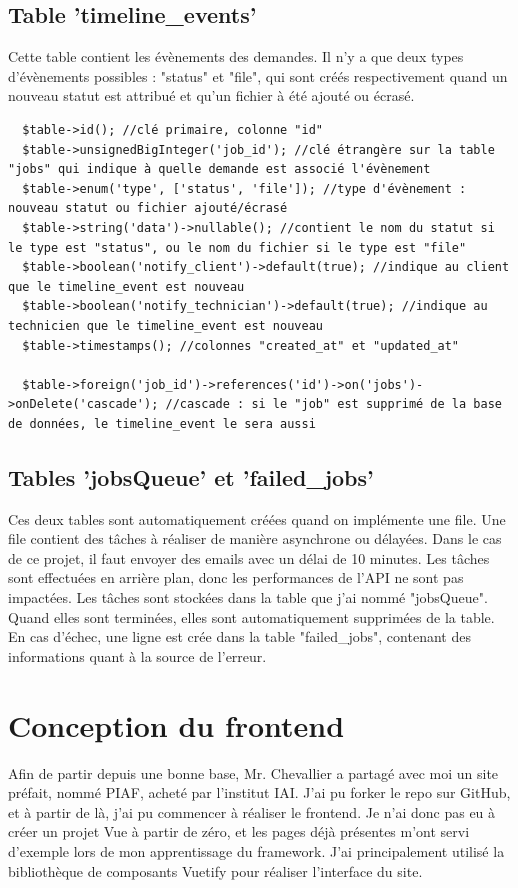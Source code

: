 \documentclass[
    iai, %
    eai, %
]{heig-tb}
\begin{document}
\section{Table 'timeline\_events'}
Cette table contient les évènements des demandes. Il n'y a que deux types d'évènements possibles : "status" et "file", qui sont créés respectivement quand un nouveau statut est attribué et qu'un fichier à été ajouté ou écrasé.

\begin{verbatim}
  $table->id(); //clé primaire, colonne "id"
  $table->unsignedBigInteger('job_id'); //clé étrangère sur la table "jobs" qui indique à quelle demande est associé l'évènement
  $table->enum('type', ['status', 'file']); //type d'évènement : nouveau statut ou fichier ajouté/écrasé
  $table->string('data')->nullable(); //contient le nom du statut si le type est "status", ou le nom du fichier si le type est "file"
  $table->boolean('notify_client')->default(true); //indique au client que le timeline_event est nouveau
  $table->boolean('notify_technician')->default(true); //indique au technicien que le timeline_event est nouveau
  $table->timestamps(); //colonnes "created_at" et "updated_at"

  $table->foreign('job_id')->references('id')->on('jobs')->onDelete('cascade'); //cascade : si le "job" est supprimé de la base de données, le timeline_event le sera aussi
\end{verbatim}

\section{Tables 'jobsQueue' et 'failed\_jobs'}
Ces deux tables sont automatiquement créées quand on implémente une file. Une file contient des tâches à réaliser de manière asynchrone ou délayées. Dans le cas de ce projet, il faut envoyer des emails avec un délai de 10 minutes. Les tâches sont effectuées en arrière plan, donc les performances de l'API ne sont pas impactées.
Les tâches sont stockées dans la table que j'ai nommé "jobsQueue". Quand elles sont terminées, elles sont automatiquement supprimées de la table. En cas d'échec, une ligne est crée dans la table "failed\_jobs", contenant des informations quant à la source de l'erreur.

\chapter{Conception du frontend}
Afin de partir depuis une bonne base, Mr. Chevallier a partagé avec moi un site préfait, nommé PIAF, acheté par l'institut IAI.
J'ai pu forker le repo sur GitHub, et à partir de là, j'ai pu commencer à réaliser le frontend. Je n'ai donc pas eu à créer un projet Vue à partir de zéro, et les pages déjà présentes m'ont servi d'exemple lors de mon apprentissage du framework. J'ai principalement utilisé la bibliothèque de composants Vuetify pour réaliser l'interface du site.
\end{document}
